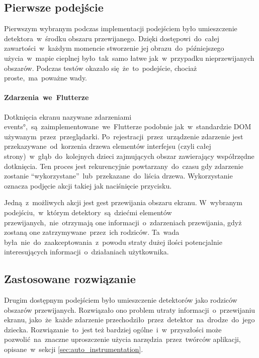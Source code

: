 
\subsection{Pierwsze podejście}
Pierwszym wybranym podczas implementacji podejściem było umieszczenie detektora~w~środku obszaru przewijanego. Dzięki dostępowi~do~całej zawartości~w~każdym momencie stworzenie jej obrazu~do~późniejszego użycia~w~mapie cieplnej było~tak~samo łatwe jak~w~przypadku nieprzewijanych obszarów. Podczas testów okazało się~że~to~podejście, chociaż proste,~ma~poważne wady.

\paragraph{Zdarzenia~we~Flutterze}
Dotknięcia ekranu nazywane zdarzeniami \ang{events},~są~zaimplementowane~we~Flutterze podobnie jak~w~standardzie DOM używanym~przez~przeglądarki. Po~rejestracji~przez~urządzenie zdarzenie jest przekazywane~od~korzenia drzewa elementów interfejsu (czyli całej strony)~w~głąb~do~kolejnych dzieci zajmujących obszar zawierający współrzędne dotknięcia. Ten proces jest rekurencyjnie powtarzany~do~czasu gdy zdarzenie zostanie ``wykorzystane''~lub~przekazane~do~liścia drzewa. Wykorzystanie oznacza podjęcie akcji takiej jak naciśnięcie przycisku.

Jedną~z~możliwych akcji jest gest przewijania obszaru ekranu. W~wybranym podejściu,~w~którym detektory~są~dziećmi elementów przewijanych,~nie~otrzymają one informacji~o~zdarzeniach przewijania, gdyż zostaną one zatrzymywane~przez~ich rodziców. Ta~wada była~nie~do~zaakceptowania~z~powodu straty dużej ilości potencjalnie interesujących informacji~o~działaniach użytkownika.

\subsection{Zastosowane rozwiązanie}
Drugim dostępnym podejściem było umieszczenie detektorów jako rodziców obszarów przewijanych. Rozwiązało ono problem utraty informacji~o~przewijaniu ekranu, jako~że~każde zdarzenie przechodziło~przez~detektor~na~drodze~do~jego dziecka. Rozwiązanie~to~jest też bardziej ogólne~i~w~przyszłości może pozwolić~na~znaczne uproszczenie użycia narzędzia~przez~twórców aplikacji, opisane~w~sekcji \ref{sec:auto_instrumentation}. 

